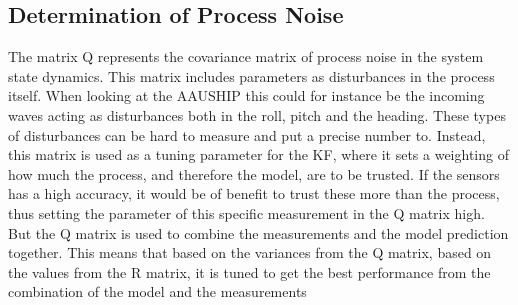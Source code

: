 \subsection{Determination of Process Noise}
The matrix Q represents the covariance matrix of process noise in the system state dynamics. This matrix includes parameters as disturbances in the process itself. When looking at the AAUSHIP this could for instance be the incoming waves acting as disturbances both in the roll, pitch and the heading. These types of disturbances can be hard to measure and put a precise number to. Instead, this matrix is used as a tuning parameter for the \ac{KF}, where it sets a weighting of how much the process, and therefore the model, are to be trusted. If the sensors has a high accuracy, it would be of benefit to trust these more than the process, thus setting the parameter of this specific measurement in the Q matrix high. But the Q matrix is used to combine the measurements and the model prediction together. This means that based on the variances from the Q matrix, based on the values from the R matrix, it is tuned to get the best performance from the combination of the model and the measurements

